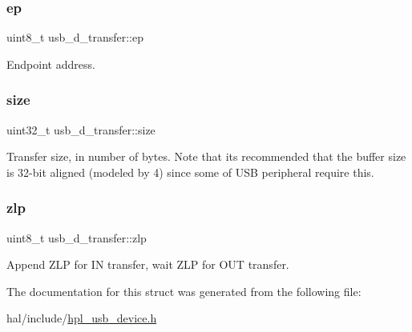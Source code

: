 \subsubsection{\texorpdfstring{ep}{ep}}
{\footnotesize\ttfamily uint8\+\_\+t usb\+\_\+d\+\_\+transfer\+::ep}

Endpoint address. \mbox{\label{structusb__d__transfer_ac7676f6907606ecd6eba03d6b0e2b915}} 
\subsubsection{\texorpdfstring{size}{size}}
{\footnotesize\ttfamily uint32\+\_\+t usb\+\_\+d\+\_\+transfer\+::size}

Transfer size, in number of bytes. Note that it\textquotesingle{}s recommended that the buffer size is 32-\/bit aligned (modeled by 4) since some of U\+SB peripheral require this. \mbox{\label{structusb__d__transfer_aa81844ece1f714100179ae8ff16d0f44}} 
\subsubsection{\texorpdfstring{zlp}{zlp}}
{\footnotesize\ttfamily uint8\+\_\+t usb\+\_\+d\+\_\+transfer\+::zlp}

Append Z\+LP for IN transfer, wait Z\+LP for O\+UT transfer. 

The documentation for this struct was generated from the following file\+:\begin{DoxyCompactItemize}
\item 
hal/include/\hyperlink{hpl__usb__device_8h}{hpl\+\_\+usb\+\_\+device.\+h}\end{DoxyCompactItemize}
